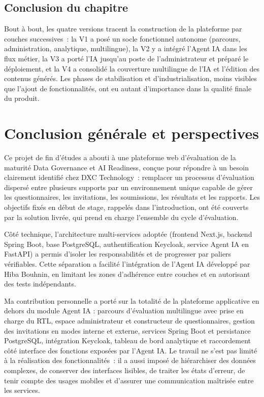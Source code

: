 \documentclass[12pt,a4paper]{report}
\begin{document}
\section*{Conclusion du chapitre}
Bout à bout, les quatre versions tracent la construction de la plateforme par couches successives~: la V1 a posé un socle fonctionnel autonome (parcours, administration, analytique, multilingue), la V2 y a intégré l'Agent IA dans les flux métier, la V3 a porté l'IA jusqu'au poste de l'administrateur et préparé le déploiement, et la V4 a consolidé la couverture multilingue de l'IA et l'édition des contenus générés. Les phases de stabilisation et d'industrialisation, moins visibles que l'ajout de fonctionnalités, ont eu autant d'importance dans la qualité finale du produit.
\setcounter{tocdepth}{2}

\chapter*{Conclusion générale et perspectives}
Ce projet de fin d'études a abouti à une plateforme web d'évaluation de la maturité Data Governance et AI Readiness, conçue pour répondre à un besoin clairement identifié chez DXC Technology~: remplacer un processus d'évaluation dispersé entre plusieurs supports par un environnement unique capable de gérer les questionnaires, les invitations, les soumissions, les résultats et les rapports. Les objectifs fixés en début de stage, rappelés dans l'introduction, ont été couverts par la solution livrée, qui prend en charge l'ensemble du cycle d'évaluation.

Côté technique, l'architecture multi-services adoptée (frontend Next.js, backend Spring Boot, base PostgreSQL, authentification Keycloak, service Agent IA en FastAPI) a permis d'isoler les responsabilités et de progresser par paliers vérifiables. Cette séparation a facilité l'intégration de l'Agent IA développé par Hiba Bouhnin, en limitant les zones d'adhérence entre couches et en autorisant des tests indépendants.

Ma contribution personnelle a porté sur la totalité de la plateforme applicative en dehors du module Agent IA : parcours d'évaluation multilingue avec prise en charge du RTL, espace administrateur et constructeur de questionnaires, gestion des invitations en modes interne et externe, services Spring Boot et persistance PostgreSQL, intégration Keycloak, tableau de bord analytique et raccordement côté interface des fonctions exposées par l'Agent IA. Le travail ne s'est pas limité à la réalisation des fonctionnalités~: il a aussi imposé de hiérarchiser des données complexes, de conserver des interfaces lisibles, de traiter les états d'erreur, de tenir compte des usages mobiles et d'assurer une communication maîtrisée entre les services.
\end{document}

